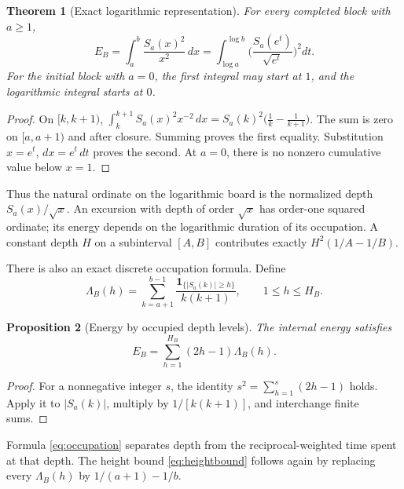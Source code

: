 \documentclass[11pt]{article}
\newtheorem{theorem}{Theorem}[section]
\newtheorem{proposition}[theorem]{Proposition}
\theoremstyle{definition}
\theoremstyle{remark}
\begin{document}
\begin{theorem}[Exact logarithmic representation]\label{thm:logrep}
For every completed block with $a\ge1$,
\begin{equation}\label{eq:logrep}
E_B=\int_a^b\frac{S_a(x)^2}{x^2}\,dx=\int_{\log a}^{\log b}\Big(\frac{S_a(e^t)}{\sqrt{e^t}}\Big)^2dt.
\end{equation}
For the initial block with $a=0$, the first integral may start at $1$, and the logarithmic integral starts at $0$.
\end{theorem}

\begin{proof}
On $[k,k+1)$, $\int_k^{k+1}S_a(x)^2x^{-2}\,dx=S_a(k)^2\big(\frac1k-\frac1{k+1}\big)$. The sum is zero on $[a,a+1)$ and after closure. Summing proves the first equality. Substitution $x=e^t$, $dx=e^t\,dt$ proves the second. At $a=0$, there is no nonzero cumulative value below $x=1$.
\end{proof}

Thus the natural ordinate on the logarithmic board is the normalized depth $S_a(x)/\sqrt x$. An excursion with depth of order $\sqrt x$ has order-one squared ordinate; its energy depends on the logarithmic duration of its occupation. A constant depth $H$ on a subinterval $[A,B]$ contributes exactly $H^2(1/A-1/B)$.

There is also an exact discrete occupation formula. Define
\begin{equation}
\Lambda_B(h)=\sum_{k=a+1}^{b-1}\frac{\mathbf 1_{\{|S_a(k)|\ge h\}}}{k(k+1)},\qquad 1\le h\le H_B.
\end{equation}

\begin{proposition}[Energy by occupied depth levels]\label{prop:occupation}
The internal energy satisfies
\begin{equation}\label{eq:occupation}
E_B=\sum_{h=1}^{H_B}(2h-1)\Lambda_B(h).
\end{equation}
\end{proposition}

\begin{proof}
For a nonnegative integer $s$, the identity $s^2=\sum_{h=1}^s(2h-1)$ holds. Apply it to $|S_a(k)|$, multiply by $1/[k(k+1)]$, and interchange finite sums.
\end{proof}

Formula \eqref{eq:occupation} separates depth from the reciprocal-weighted time spent at that depth. The height bound \eqref{eq:heightbound} follows again by replacing every $\Lambda_B(h)$ by $1/(a+1)-1/b$.
\end{document}
